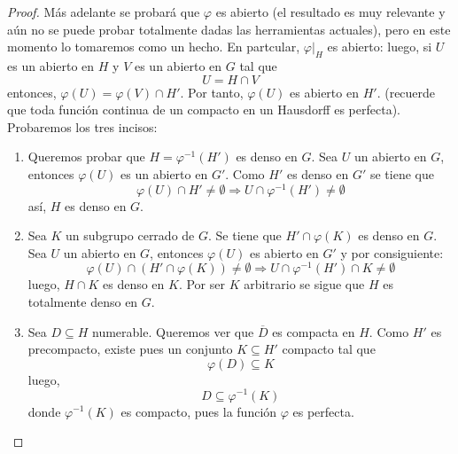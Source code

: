 \documentclass[12pt]{report}
\theoremstyle{largebreak}
\newcommand{\Cls}[1]{\ensuremath{\overline{#1}}}
\begin{document}
    \begin{proof}
        Más adelante se probará que $\varphi$ es abierto (el resultado es muy relevante y aún no se puede probar totalmente dadas las herramientas actuales), pero en este momento lo tomaremos como un hecho. En partcular, $\varphi\big|_H$ es abierto: luego, si $U$ es un abierto en $H$ y $V$ es un abierto en $G$ tal que
        \begin{equation*}
            U=H\cap V
        \end{equation*}
        entonces, $\varphi(U)=\varphi(V)\cap H'$. Por tanto, $\varphi(U)$ es abierto en $H'$. (recuerde que toda función continua de un compacto en un Hausdorff es perfecta). Probaremos los tres incisos:

        \begin{enumerate}
            \item Queremos probar que $H=\varphi^{-1}(H')$ es denso en $G$. Sea $U$ un abierto en $G$, entonces $\varphi(U)$ es un abierto en $G'$. Como $H'$ es denso en $G'$ se tiene que
            \begin{equation*}
                \varphi(U)\cap H'\neq\emptyset\Rightarrow U\cap\varphi^{-1}(H')\neq\emptyset
            \end{equation*}
            así, $H$ es denso en $G$.
            \item Sea $K$ un subgrupo cerrado de $G$. Se tiene que $H'\cap\varphi(K)$ es denso en $G$. Sea $U$ un abierto en $G$, entonces $\varphi(U)$ es abierto en $G'$ y por consiguiente:
            \begin{equation*}
                \varphi(U)\cap\left(H'\cap\varphi(K)\right)\neq\emptyset
                \Rightarrow U\cap \varphi^{-1}(H')\cap K\neq\emptyset
            \end{equation*}
            luego, $H\cap K$ es denso en $K$. Por ser $K$ arbitrario se sigue que $H$ es totalmente denso en $G$. 
            \item Sea $D\subseteq H$ numerable. Queremos ver que $\Cls{D}$ es compacta en $H$. Como $H'$ es precompacto, existe pues un conjunto $K\subseteq H'$ compacto tal que
            \begin{equation*}
                \varphi(D)\subseteq K
            \end{equation*}
            luego,
            \begin{equation*}
                D\subseteq \varphi^{-1}(K)
            \end{equation*}
            donde $\varphi^{-1}(K)$ es compacto, pues la función $\varphi$ es perfecta.
        \end{enumerate}
    \end{proof}
\end{document}
